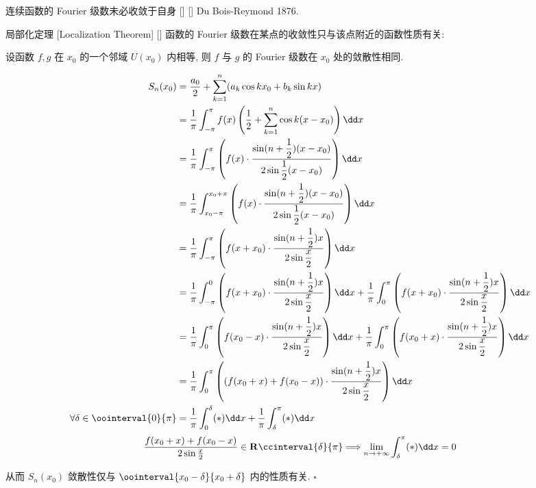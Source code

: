 \documentclass[UTF8]{ctexart}
\begin{document}
			\begin{cxmp}
			    []
			    {连续函数的 Fourier 级数未必收敛于自身}
			    []
			    []
				Du Bois-Reymond 1876. 
			\end{cxmp}
			
			\begin{thm}
			    []
			    {局部化定理 }
			    [Localization Theorem]
			    []
				函数的 Fourier 级数在某点的收敛性只与该点附近的函数性质有关: 

				设函数 \(f,g\) 在 \(x_0\) 的一个邻域 \(U(x_0)\) 内相等, 则 \(f\) 与 \(g\) 的 Fourier 级数在 \(x_0\) 处的敛散性相同. 
			\end{thm}

			\begin{prf}
				\[
				\begin{aligned}
					S_n(x_0)
					& = \frac{a_0}{2}+\sum_{k=1}^{n}(a_k\cos kx_0+b_k\sin kx)\\
					& = \frac{1}{\pi}\int_{-\pi}^{\pi}f(x)\left(\frac{1}{2}+\sum_{k=1}^{n}\cos k(x-x_0)\right)\dd x\\
					& = \frac{1}{\pi}\int_{-\pi}^{\pi}\left(f(x)\cdot\frac{\sin(n+\dfrac{1}{2})(x-x_0)}{2\sin\dfrac{1}{2}(x-x_0)}\right)\dd x\\
					& = \frac{1}{\pi}\int_{x_0-\pi}^{x_0+\pi}\left(f(x)\cdot\frac{\sin(n+\dfrac{1}{2})(x-x_0)}{2\sin\dfrac{1}{2}(x-x_0)}\right)\dd x\\
					& = \frac{1}{\pi}\int_{-\pi}^{\pi}\left(f(x+x_0)\cdot\frac{\sin(n+\dfrac{1}{2})x}{2\sin\dfrac{x}{2}}\right)\dd x\\
					& = \frac{1}{\pi}\int_{-\pi}^{0}\left(f(x+x_0)\cdot\frac{\sin(n+\dfrac{1}{2})x}{2\sin\dfrac{x}{2}}\right)\dd x
					+\frac{1}{\pi}\int_{0}^{\pi}\left(f(x+x_0)\cdot\frac{\sin(n+\dfrac{1}{2})x}{2\sin\dfrac{x}{2}}\right)\dd x\\
					& = \frac{1}{\pi}\int_{0}^{\pi}\left(f(x_0-x)\cdot\frac{\sin(n+\dfrac{1}{2})x}{2\sin\dfrac{x}{2}}\right)\dd x
					+\frac{1}{\pi}\int_{0}^{\pi}\left(f(x_0+x)\cdot\frac{\sin(n+\dfrac{1}{2})x}{2\sin\dfrac{x}{2}}\right)\dd x\\
					& = \frac{1}{\pi}\int_{0}^{\pi}\left((f(x_0+x)+f(x_0-x))\cdot\frac{\sin(n+\dfrac{1}{2})x}{2\sin\dfrac{x}{2}}\right)\dd x\\
					\forall\delta\in\oointerval{0}{\pi}
					& = \frac{1}{\pi}\int_{0}^{\delta}(*)\dd x
					+\frac{1}{\pi}\int_{\delta}^{\pi}(*)\dd x\\
				\end{aligned}\]
				\[\frac{f(x_0+x)+f(x_0-x)}{2\sin\frac{x}{2}}\in\mathbf{R}\ccinterval{\delta}{\pi}\Longrightarrow\lim_{n\to+\infty}\int_{\delta}^{\pi}(*)\dd x=0\]

				从而 \(S_n(x_0)\) 敛散性仅与 \(\oointerval{x_0-\delta}{x_0+\delta}\) 内的性质有关. 
				\(\square\)
			\end{prf}
\end{document}
